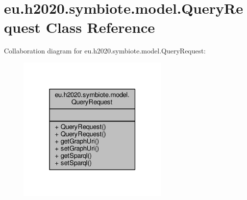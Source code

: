 \hypertarget{classeu_1_1h2020_1_1symbiote_1_1model_1_1QueryRequest}{}\section{eu.\+h2020.\+symbiote.\+model.\+Query\+Request Class Reference}
\label{classeu_1_1h2020_1_1symbiote_1_1model_1_1QueryRequest}


Collaboration diagram for eu.\+h2020.\+symbiote.\+model.\+Query\+Request\+:
\nopagebreak
\begin{figure}[H]
\begin{center}
\leavevmode
\includegraphics[width=211pt]{classeu_1_1h2020_1_1symbiote_1_1model_1_1QueryRequest__coll__graph}
\end{center}
\end{figure}
